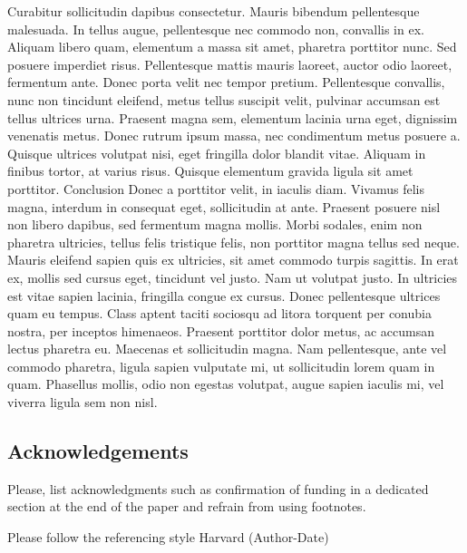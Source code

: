 \documentclass[12pt,a4paper,twoside, twocolumn]{article}
\begin{document}
Curabitur sollicitudin dapibus consectetur. Mauris bibendum pellentesque malesuada. In tellus augue, pellentesque nec commodo non, convallis in ex. Aliquam libero quam, elementum a massa sit amet, pharetra porttitor nunc. Sed posuere imperdiet risus. Pellentesque mattis mauris laoreet, auctor odio laoreet, fermentum ante. Donec porta velit nec tempor pretium. Pellentesque convallis, nunc non tincidunt eleifend, metus tellus suscipit velit, pulvinar accumsan est tellus ultrices urna. Praesent magna sem, elementum lacinia urna eget, dignissim venenatis metus. Donec rutrum ipsum massa, nec condimentum metus posuere a. Quisque ultrices volutpat nisi, eget fringilla dolor blandit vitae. Aliquam in finibus tortor, at varius risus. Quisque elementum gravida ligula sit amet porttitor. 
Conclusion
Donec a porttitor velit, in iaculis diam. Vivamus felis magna, interdum in consequat eget, sollicitudin at ante. Praesent posuere nisl non libero dapibus, sed fermentum magna mollis. Morbi sodales, enim non pharetra ultricies, tellus felis tristique felis, non porttitor magna tellus sed neque. Mauris eleifend sapien quis ex ultricies, sit amet commodo turpis sagittis. In erat ex, mollis sed cursus eget, tincidunt vel justo. Nam ut volutpat justo. In ultricies est vitae sapien lacinia, fringilla congue ex cursus. Donec pellentesque ultrices quam eu tempus. Class aptent taciti sociosqu ad litora torquent per conubia nostra, per inceptos himenaeos. Praesent porttitor dolor metus, ac accumsan lectus pharetra eu. Maecenas et sollicitudin magna. Nam pellentesque, ante vel commodo pharetra, ligula sapien vulputate mi, ut sollicitudin lorem quam in quam. Phasellus mollis, odio non egestas volutpat, augue sapien iaculis mi, vel viverra ligula sem non nisl. 


\printendnotes[custom]
\newpage

 
\subsection*{Acknowledgements}
Please, list acknowledgments such as confirmation of funding in a dedicated section at the end of the paper and refrain from using footnotes.



Please follow the referencing style Harvard (Author-Date)

\end{document}
